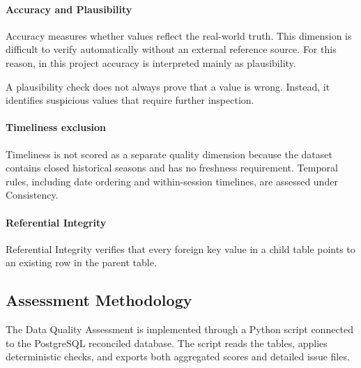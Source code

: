 \documentclass[a4paper,11pt]{article}
\begin{document}
	\paragraph{Accuracy and Plausibility}
	
	Accuracy measures whether values reflect the real-world truth.
	This dimension is difficult to verify automatically without an external reference source.
	For this reason, in this project accuracy is interpreted mainly as plausibility.
	
	A plausibility check does not always prove that a value is wrong.
	Instead, it identifies suspicious values that require further inspection.

	
	\paragraph{Timeliness exclusion}
	
	Timeliness is not scored as a separate quality dimension because the dataset contains
	closed historical seasons and has no freshness requirement. Temporal rules, including
	date ordering and within-session timelines, are assessed under Consistency.
	

	
	\paragraph{Referential Integrity}
	
	Referential Integrity verifies that every foreign key value in a child table points to an existing row in the parent table.


	\subsection{Assessment Methodology}
	
	The Data Quality Assessment is implemented through a Python script connected to the PostgreSQL reconciled database.
	The script reads the tables, applies deterministic checks, and exports both aggregated scores and detailed issue files.
	
\end{document}
